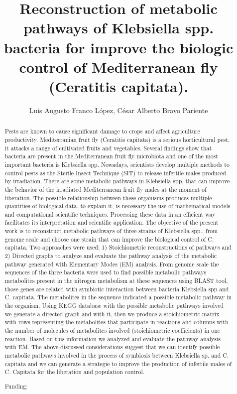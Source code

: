 \documentclass[twoside]{article}
\title{\vspace{-15mm}\fontsize{24pt}{10pt}\selectfont\textbf{ Reconstruction of metabolic pathways of Klebsiella spp. bacteria for improve the biologic control of Mediterranean fly (Ceratitis capitata). }} %
\author{ Luis Augusto Franco L\'opez, C\'esar Alberto Bravo Pariente }
\affil{ Universidade Estadual de Santa Cruz,  Ilh\'eus,  Bahia,  Brazil }
\date{}
\begin{document}
  
  
  \maketitle %
  
  
  \thispagestyle{fancy} %
  
  
  \begin{abstract}
  Pests are known to cause significant damage to crops and affect agriculture productivity. Mediterranian fruit fly (Ceratitis capitata) is a serious horticultural pest,  it attacks a range of cultivated fruits and vegetables. Several findings show that bacteria are present in the Mediterranean fruit fly microbiota and one of the most important bacteria is Klebsiella spp. Nowadays,  scientists develop multiple methods to control pests as the Sterile Insect Technique (SIT) to release infertile males produced by irradiation. There are some metabolic pathways in Klebsiella spp. that can improve the behavior of the irradiated Mediterranean fruit fly males at the moment of liberation. The possible relationship between these organisms produces multiple quantities of biological data,  to explain it,  is necessary the use of mathematical models and computational scientific techniques. Processing these data in an efficient way facilitates its interpretation and scientific application. The objective of the present work is to reconstruct metabolic pathways of three strains of Klebsiella spp.,  from genome scale and choose one strain that can improve the biological control of C. capitata. Two approaches were used; 1) Stoichiometric reconstructions of pathways and 2) Directed graphs to analyze and evaluate the pathway analysis of the metabolic pathway generated with Elementary Modes (EM) analysis. From genome scale the sequences of the three bacteria were used to find possible metabolic pathways metabolites present in the nitrogen metabolism at these sequences using BLAST tool,  those genes are related with symbiotic interaction between bacteria Klebsiella spp and C. capitata. The metabolites in the sequence indicated a possible metabolic pathway in the organism. Using KEGG database with the possible metabolic pathways involved we generate a directed graph and with it,  then we produce a stoichiometric matrix with rows representing the metabolites that participate in reactions and columns with the number of molecules of metabolites involved (stoichiometric coefficients) in one reaction. Based on this information we analyzed and evaluate the pathway analysis with EM. The above-discussed considerations suggest that we can identify possible metabolic pathways involved in the process of symbiosis between Klebsiella sp. and C. capitata and we can generate a strategie to improve the production of infertile males of C. Capitata for the liberation and population control.
  
  Funding:  \\ 
  \end{abstract}
  
\end{document}

